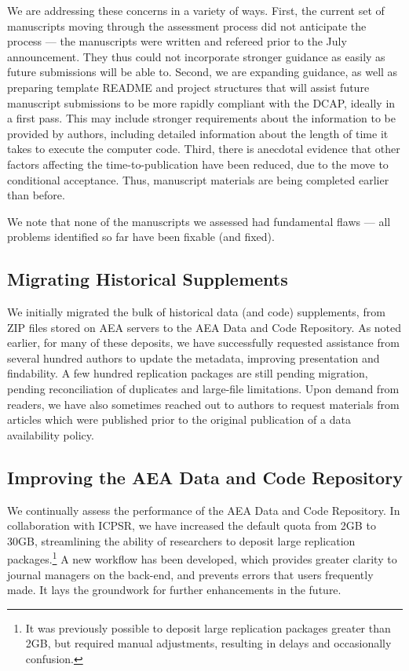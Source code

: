 \documentclass[PP]{AEA}
\newcommand{\aeadcr}{AEA Data and Code Repository}
\begin{document}
We are addressing these concerns in a variety of ways. First, the current set of manuscripts moving through the assessment process did not anticipate the process --- the manuscripts were written and refereed prior to the July announcement. They thus could not incorporate stronger guidance as easily as future submissions will be able to. Second, we are expanding guidance, as well as preparing template README and project structures that will assist future manuscript submissions to be more rapidly compliant with the \ac{DCAP}, ideally in a first pass. This may include stronger requirements about the information to be provided by authors, including detailed information about the length of time it takes to execute the computer code.
Third, there is anecdotal evidence that other factors affecting the time-to-publication have been reduced, due to the move to conditional acceptance. Thus, manuscript materials are being completed earlier than before. 

We note that none of the \jiramcs{} manuscripts we assessed had  fundamental flaws --- all problems identified so far have been fixable (and fixed). 

\subsection{Migrating Historical Supplements}
\label{sec:migration}

We initially migrated the bulk of historical data (and code) supplements, from ZIP files stored on AEA servers to the \aeadcr{}. As noted earlier, for many of these deposits, we have successfully requested assistance from several hundred authors to update the metadata, improving presentation and findability. A few hundred replication packages are still pending migration, pending reconciliation of duplicates and large-file limitations. Upon demand from readers, we have also sometimes reached out to authors to request materials from articles which were published prior to the original publication of a data availability policy. 


\subsection{Improving the \aeadcr{}}
\label{sec:improvingaeadcr}

We continually assess the performance of the \aeadcr{}. In collaboration with ICPSR, we have increased the default quota from 2GB to 30GB, streamlining the ability of researchers to deposit large replication packages.\footnote{It was previously possible to deposit large replication packages greater than 2GB, but required manual adjustments, resulting in delays and occasionally confusion.} A new workflow has been developed, which provides greater clarity to journal managers on the back-end, and prevents errors that users frequently made. It lays the groundwork for further enhancements in the future. 
\end{document}
